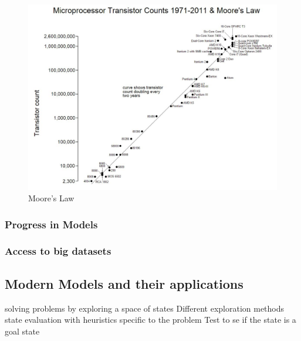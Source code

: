 \documentclass[12pt]{article}
\begin{document}
\begin{figure}[h]
    \centering
    \includegraphics[width=\textwidth]{moore}
    \caption{Moore's Law}
    \label{fig:moore}
\end{figure}






\subsubsection{Progress in Models}



\subsubsection{Access to big datasets}




\pagebreak

\subsection{Modern Models and their applications}

solving problems by exploring a space of states
Different exploration methods
state evaluation with heuristics specific to the problem
Test to se if the state is a goal state
\end{document}
